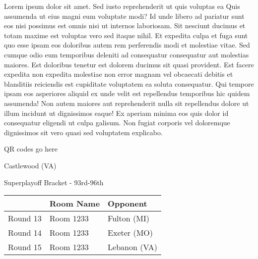 \documentclass{article}%
\begin{document}
\vspace*{8pt}%
\linebreak%
\newline%
\newline%
Lorem ipsum dolor sit amet. Sed iusto reprehenderit ut quis voluptas ea Quis assumenda ut eius magni eum voluptate modi? Id unde libero ad pariatur sunt eos nisi possimus est omnis nisi ut internos laboriosam. Sit nesciunt ducimus et totam maxime est voluptas vero sed itaque nihil. Et expedita culpa et fuga sunt quo esse ipsam eos doloribus autem rem perferendis modi et molestiae vitae.\newline%
\newline%
Sed cumque odio eum temporibus deleniti ad consequatur consequatur aut molestias maiores. Est doloribus tenetur est dolorem ducimus sit quasi provident. Est facere expedita non expedita molestiae non error magnam vel obcaecati debitis et blanditiis reiciendis est cupiditate voluptatem ea soluta consequatur. Qui tempore ipsam eos asperiores aliquid ex unde velit est repellendus temporibus hic quidem assumenda!\newline%
\newline%
Non autem maiores aut reprehenderit nulla sit repellendus dolore ut illum incidunt ut dignissimos eaque! Ex aperiam minima eos quis dolor id consequatur eligendi ut culpa galisum. Non fugiat corporis vel doloremque dignissimos sit vero quasi sed voluptatem explicabo.\newline%
\newline%
%
\vspace*{30pt}%
\begin{center}%
\begin{Huge}%
QR codes go here%
\end{Huge}%
\end{center}%
\newpage%
\begin{center}%
\begin{Huge}%
Castlewood (VA)%
\end{Huge}%
\vspace*{8pt}%
\linebreak%
\begin{Large}%
Superplayoff Bracket {-} 93rd{-}96th%
\end{Large}%
\end{center}%
%
\begin{tabularx}{\textwidth}{|c|Y|Y|}%
\hline%
&Room Name&Opponent\\%
\hline%
Round 13&Room 1233&Fulton (MI)\\%
Round 14&Room 1233&Exeter (MO)\\%
Round 15&Room 1233&Lebanon (VA)\\%
\hline%
\end{tabularx}%
\end{document}

